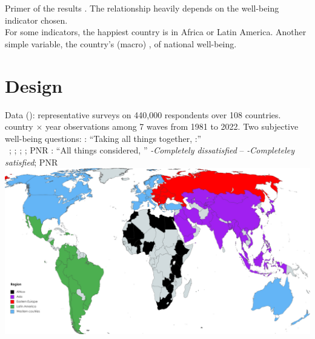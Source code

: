 \documentclass[aspectratio=169,xcolor=dvipsnames, 11pt,mathserif]{beamer}
\begin{document}
\begin{frame}{Primer of the results}
    \bbvsp
    \ip {}.
    \ip The relationship heavily depends on the well-being indicator chosen. \pause \\ For some indicators, the happiest country is in Africa or Latin America.\pause
    \ip Another simple variable, the country's (macro) ,  of national well-being.
    \ee
\end{frame}

\section{Design}

\begin{frame}{Data}
    \bbvsp
    \ip {} (): representative surveys on 440,000 respondents over 108 countries.
     country $\times$ year observations among 7 waves from 1981 to 2022.
    \ip Two subjective well-being questions:
    \bbvsp 
    \ip {}: ``Taking all things together, :'' \\ ~\textit{}; \textit{}; \textit{}; \textit{}; PNR %
    \ip {}: ``All things considered, '' \textit{-Completely dissatisfied} -- \textit{-Completeley satisfied}; PNR %
    \ee
    \ee
    \centering \includegraphics[height=.5\textheight]{../figures/WVS_countries_regions}
\end{frame}
\end{document}

